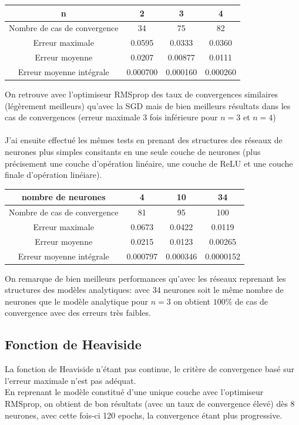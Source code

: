 \documentclass[a4paper,11pt,twoside]{report}
\begin{document}
	\begin{center}
		\begin{tabular}{ |c||c|c|c| } 
			\hline
			n & 2 & 3 & 4 \\
			\hline
			\hline
			Nombre de cas de convergence & 34 & 75 & 82\\
			\hline
			Erreur maximale & 0.0595 & 0.0333 & 0.0360\\
			\hline
			Erreur moyenne  & 0.0207 & 0.00877 & 0.0111\\
			\hline
			Erreur moyenne intégrale & 0.000700 & 0.000160 & 0.000260 \\
			\hline
		\end{tabular}	
	\end{center}
	On retrouve avec l'optimiseur RMSprop des taux de convergences similaires (légèrement meilleurs) qu'avec la SGD mais de bien meilleurs résultats dans les cas de convergences (erreur maximale 3 fois inférieure pour $n=3$ et $n=4$)\\ \\
	J'ai ensuite effectué les mêmes tests en prenant des structures des réseaux de neurones plus simples consitants en une seule couche de neurones (plus précisement une couche d'opération linéaire, une couche de ReLU et une couche finale d'opération linéiare).
	\begin{center}
		\begin{tabular}{ |c||c|c|c| } 
			\hline
			nombre de neurones & 4 & 10 & 34 \\
			\hline
			\hline
			Nombre de cas de convergence & 81 & 95 & 100\\
			\hline
			Erreur maximale & 0.0673 & 0.0422 & 0.0119\\
			\hline
			Erreur moyenne  & 0.0215 & 0.0123 & 0.00265\\
			\hline
			Erreur moyenne intégrale & 0.000797 & 0.000346 & 0.0000152 \\
			\hline
		\end{tabular}	
	\end{center}
	
	On remarque de bien meilleurs performances qu'avec les réseaux reprenant les structures des modèles analytiques: avec 34 neurones soit le même nombre de neurones que le modèle analytique pour $n=3$ on obtient $100\%$ de cas de convergence avec des erreurs très faibles.
	\subsection{Fonction de Heaviside}
	La fonction de Heaviside n'étant pas continue, le critère de convergence basé sur l'erreur maximale n'est pas adéquat.\\
	En reprenant le modèle constitué d'une unique couche avec l'optimiseur RMSprop, on obtient de bon résultats (avec un taux de convergence élevé) dès 8 neurones, avec cette fois-ci 120 epochs, la convergence étant plus progressive.
	
\end{document}
